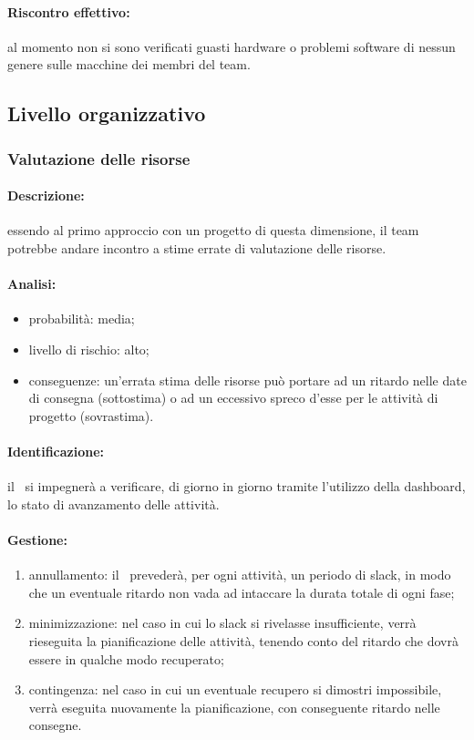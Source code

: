 \documentclass[../PianoProgetto.tex]{subfiles}
\begin{document}
	\paragraph*{Riscontro effettivo:} al momento non si sono verificati guasti hardware o problemi software di nessun genere sulle macchine dei membri del team.

\subsection{Livello organizzativo}

\subsubsection{Valutazione delle risorse}

	\paragraph*{Descrizione:} essendo al primo approccio con un progetto di questa dimensione, il team potrebbe andare incontro a stime errate di valutazione delle risorse.
	
	\paragraph*{Analisi:}
	\begin{itemize}
		\item probabilità: media;
		\item livello di rischio: alto;
		\item conseguenze: un'errata stima delle risorse può portare ad un ritardo nelle date di consegna (sottostima) o ad un eccessivo spreco d'esse per le attività di progetto (sovrastima).
	\end{itemize}
	
	\paragraph*{Identificazione:} il \responsabilediprogetto\ si impegnerà a verificare, di giorno in giorno tramite l'utilizzo della dashboard, lo stato di avanzamento delle attività.
	
	\paragraph*{Gestione:}
	\begin{enumerate}
		\item annullamento: il \responsabilediprogetto\ prevederà, per ogni attività, un periodo di slack, in modo che un eventuale ritardo non vada ad intaccare la durata totale di ogni fase;
		\item minimizzazione: nel caso in cui lo slack si rivelasse insufficiente, verrà rieseguita la pianificazione delle attività, tenendo conto del ritardo che dovrà essere in qualche modo recuperato;
		\item contingenza: nel caso in cui un eventuale recupero si dimostri impossibile, verrà eseguita nuovamente la pianificazione, con conseguente ritardo nelle consegne.
	\end{enumerate}	
	
\end{document}
